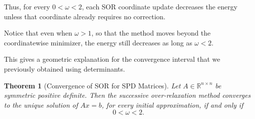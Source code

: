 \documentclass[11pt,a4paper]{article}
\newtheorem{theorem}{Theorem}[section]
\theoremstyle{definition}
\theoremstyle{remark}
\begin{document}
Thus, for every $0<\omega<2$, each SOR
coordinate update decreases the energy unless
that coordinate already requires no correction.

Notice that even when $\omega>1$, so that
the method moves beyond the coordinatewise
minimizer, the energy still decreases as long
as $\omega<2$.

This gives a geometric explanation for the
convergence interval that we previously
obtained using determinants.


\begin{theorem}[Convergence of SOR for SPD Matrices]
Let $A\in\mathbb{R}^{n\times n}$ be symmetric
positive definite. Then the successive
over-relaxation method converges to the unique
solution of $Ax=b$, for every initial
approximation, if and only if
\[
    \boxed{0<\omega<2.}
\]
\end{theorem}
\end{document}
